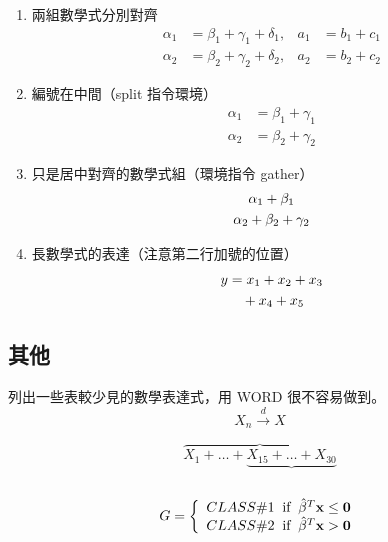 \begin{enumerate}
    \item 兩組數學式分別對齊
    \begin{align}
        \alpha_1 &= \beta_1+\gamma_1+\delta_1, &a_1 &= b_1+c_1\\
        \alpha_2 &= \beta_2+\gamma_2+\delta_2, &a_2 &= b_2+c_2
    \end{align}

    \item 編號在中間（{\A split} 指令環境）
        \begin{equation}
            \begin{split}
                \alpha_1 &= \beta_1+\gamma_1\\
                \alpha_2 &= \beta_2+\gamma_2
            \end{split}
        \end{equation}
    \item 只是居中對齊的數學式組（環境指令 {\A gather}）
        \begin{gather}
        \alpha_1 + \beta_1\notag\\
        \alpha_2 + \beta_2 + \gamma_2\notag
        \end{gather}

    \item 長數學式的表達（注意第二行加號的位置）
        \begin{align}
            y  	&= x_1 + x_2 + x_3 \notag\\
                	&\quad + x_4 + x_5
        \end{align}
\end{enumerate}

\subsection{其他}
列出一些表較少見的數學表達式，用 WORD 很不容易做到。
  $$X_{n} \stackrel{d}{\longrightarrow} X$$
  
  $$\overbrace{X_{1} + \ldots + \underbrace{X_{15} + \ldots + X_{30}}}$$\\
  \begin{equation*}
    G = \left\{\begin{array}{l}
          CLASS\#1 \;\;\mbox{if} \;\; \hat{\beta}^T\bf{x} \leq 0 \\
          CLASS\#2 \;\;\mbox{if} \;\; \hat{\beta}^T\bf{x} > 0
        \end{array}\right.
  \end{equation*}\\

